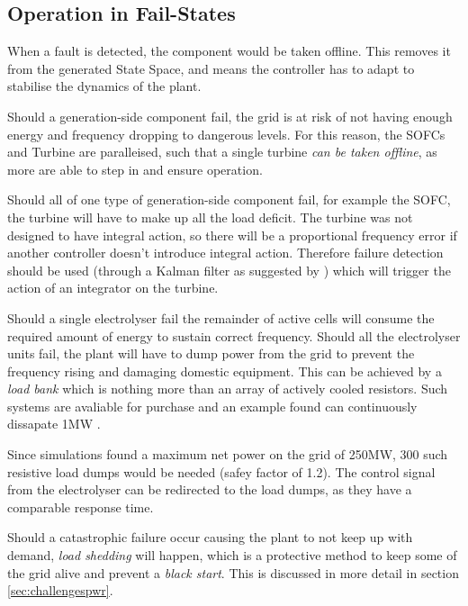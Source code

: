 \subsection{Operation in Fail-States}
\label{sec:failurestate}

When a fault is detected, the component would be taken offline.
This removes it from the generated State Space, and means the controller has to adapt to stabilise the dynamics of the plant.

Should a generation-side component fail, the grid is at risk of not having enough energy and frequency dropping to dangerous levels.
For this reason, the SOFCs and Turbine are paralleised, such that a single turbine \emph{can be taken offline}, as more are able to step in and ensure operation.

Should all of one type of generation-side component fail, for example the SOFC, the turbine will have to make up all the load deficit.
The turbine was not designed to have integral action, so there will be a proportional frequency error if another controller doesn't introduce integral action.
Therefore failure detection should be used (through a Kalman filter as suggested by \cite{power:kalman}) which will trigger the action of an integrator on the turbine.

Should a single electrolyser fail the remainder of active cells will consume the required amount of energy to sustain correct frequency.
Should all the electrolyser units fail, the plant will have to dump power from the grid to prevent the frequency rising and damaging domestic equipment.
This can be achieved by a \emph{load bank} which is nothing more than an array of actively cooled resistors.
Such systems are avaliable for purchase and an example found can continuously dissapate 1MW \cite{power:rdump}.

Since simulations found a maximum net power on the grid of 250MW, 300 such resistive load dumps would be needed (safey factor of 1.2). 
The control signal from the electrolyser can be redirected to the load dumps, as they have a comparable response time.

Should a catastrophic failure occur causing the plant to not keep up with demand, \emph{load shedding} will happen, which is a protective method to keep some of the grid alive and prevent a \emph{black start}. This is discussed in more detail in section \ref{sec:challengespwr}.
